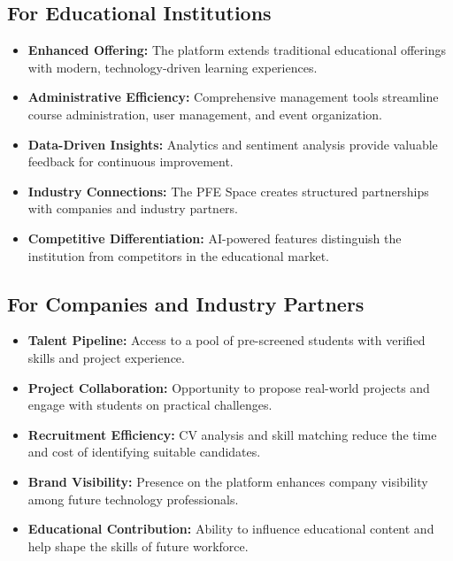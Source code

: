\documentclass[12pt,a4paper]{report}
\begin{document}
\subsection{For Educational Institutions}

\begin{itemize}
    \item \textbf{Enhanced Offering:} The platform extends traditional educational offerings with modern, technology-driven learning experiences.

    \item \textbf{Administrative Efficiency:} Comprehensive management tools streamline course administration, user management, and event organization.

    \item \textbf{Data-Driven Insights:} Analytics and sentiment analysis provide valuable feedback for continuous improvement.

    \item \textbf{Industry Connections:} The PFE Space creates structured partnerships with companies and industry partners.

    \item \textbf{Competitive Differentiation:} AI-powered features distinguish the institution from competitors in the educational market.
\end{itemize}

\subsection{For Companies and Industry Partners}

\begin{itemize}
    \item \textbf{Talent Pipeline:} Access to a pool of pre-screened students with verified skills and project experience.

    \item \textbf{Project Collaboration:} Opportunity to propose real-world projects and engage with students on practical challenges.

    \item \textbf{Recruitment Efficiency:} CV analysis and skill matching reduce the time and cost of identifying suitable candidates.

    \item \textbf{Brand Visibility:} Presence on the platform enhances company visibility among future technology professionals.

    \item \textbf{Educational Contribution:} Ability to influence educational content and help shape the skills of future workforce.
\end{itemize}
\end{document}
